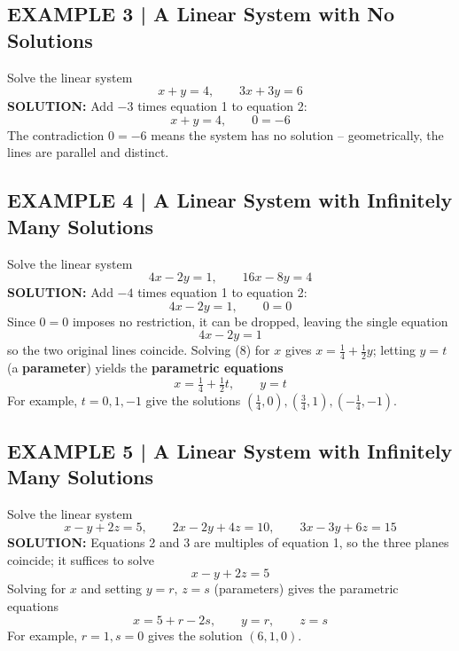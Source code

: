 \documentclass{article}
\theoremstyle{mystyle}
\begin{document}
\subsection*{EXAMPLE 3 | A Linear System with No Solutions}
Solve the linear system
\[
x+y=4,\qquad 3x+3y=6
\]
\textbf{SOLUTION:} Add $-3$ times equation 1 to equation 2:
\[
x+y=4,\qquad 0=-6
\]
The contradiction $0=-6$ means the system has no solution -- geometrically, the lines are parallel and distinct.

\subsection*{EXAMPLE 4 | A Linear System with Infinitely Many Solutions}
Solve the linear system
\[
4x-2y=1,\qquad 16x-8y=4
\]
\textbf{SOLUTION:} Add $-4$ times equation 1 to equation 2:
\[
4x-2y=1,\qquad 0=0
\]
Since $0=0$ imposes no restriction, it can be dropped, leaving the single equation
\[
4x-2y=1 \tag{8}
\]
so the two original lines coincide. Solving (8) for $x$ gives $x=\tfrac14+\tfrac12y$; letting $y=t$ (a \textbf{parameter}) yields the \textbf{parametric equations}
\[
x=\tfrac14+\tfrac12t,\qquad y=t
\]
For example, $t=0,1,-1$ give the solutions $\left(\tfrac14,0\right),\left(\tfrac34,1\right),\left(-\tfrac14,-1\right)$.

\subsection*{EXAMPLE 5 | A Linear System with Infinitely Many Solutions}
Solve the linear system
\[
x-y+2z=5,\qquad 2x-2y+4z=10,\qquad 3x-3y+6z=15
\]
\textbf{SOLUTION:} Equations 2 and 3 are multiples of equation 1, so the three planes coincide; it suffices to solve
\[
x-y+2z=5 \tag{9}
\]
Solving for $x$ and setting $y=r,\,z=s$ (parameters) gives the parametric equations
\[
x=5+r-2s,\qquad y=r,\qquad z=s
\]
For example, $r=1,s=0$ gives the solution $(6,1,0)$.
\end{document}
